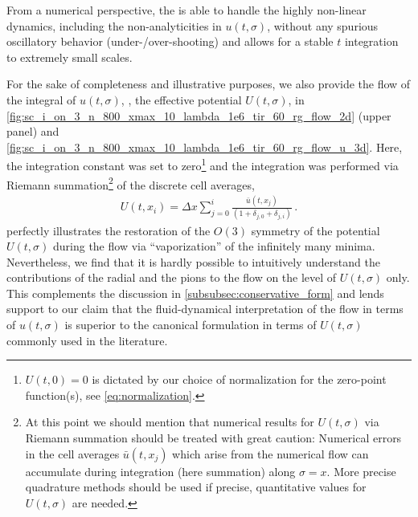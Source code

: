 From a numerical perspective, the \ktScheme{} is able to handle the highly non-linear dynamics, including the non-analyticities in $u ( t, \sigma )$, without any spurious oscillatory behavior (under-/over-shooting) and allows for a stable $t$ integration to extremely small \ir{} scales.

For the sake of completeness and illustrative purposes, we also provide the \frg{} flow of the integral of $u ( t, \sigma )$, \ie{}, the effective potential $U ( t, \sigma )$, in \cref{fig:sc_i_on_3_n_800_xmax_10_lambda_1e6_tir_60_rg_flow_2d} (upper panel) and \cref{fig:sc_i_on_3_n_800_xmax_10_lambda_1e6_tir_60_rg_flow_u_3d}.
Here, the integration constant was set to zero\footnote{%
	$U ( t, 0 ) = 0$ is dictated by our choice of normalization for the zero-point function(s), see \cref{eq:normalization}.
} and the integration was performed via Riemann summation\footnote{%
	At this point we should mention that numerical results for $U ( t, \sigma )$ via Riemann summation should be treated with great caution: Numerical errors in the cell averages $\bar{u} ( t, x_j )$ which arise from the numerical \frg{} flow can accumulate during integration (here summation) along $\sigma = x$.
	More precise quadrature methods should be used if precise, quantitative values for $U ( t, \sigma )$ are needed.
} of the discrete cell averages,
	\begin{align}
		U ( t, x_i ) = \Delta x \sum_{j = 0}^{i} \frac{\bar{u} ( t, x_j )}{( 1 + \delta_{j, 0} + \delta_{j, i} )} \, .	\label{eq:riemann_sum}
	\end{align}
 perfectly illustrates the restoration of the $O(3)$ symmetry of the potential $U ( t, \sigma )$ during the \frg{} flow via ``vaporization'' of the infinitely many minima.
Nevertheless, we find that it is hardly possible to intuitively understand the contributions of the radial \sigmaMode{} and the pions to the \frg{} flow on the level of $U ( t, \sigma )$ only.
This complements the discussion in \cref{subsubsec:conservative_form} and lends support to our claim that the fluid-dynamical interpretation of the \frg{} flow in terms of $u ( t, \sigma )$ is superior to the canonical formulation in terms of $U ( t, \sigma )$ commonly used in the \frg{} literature.

